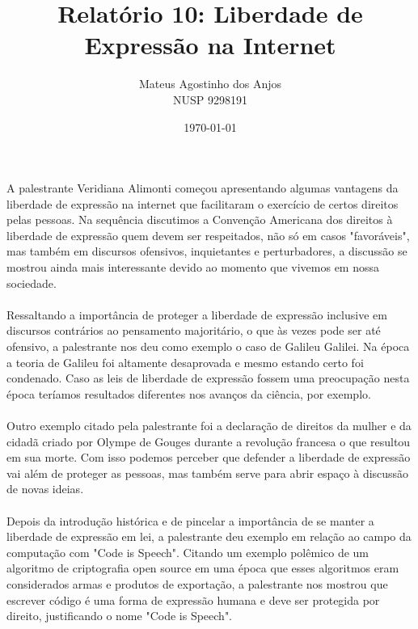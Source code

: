 \documentclass[12pt]{article}
\title{Relatório 10: Liberdade de Expressão na Internet}
\author{Mateus Agostinho dos Anjos\\NUSP 9298191}
\date{\today}
\begin{document}
	\maketitle
	\paragraph{}
		A palestrante Veridiana Alimonti começou apresentando algumas vantagens
		da liberdade de expressão na internet que facilitaram o exercício de certos 
		direitos pelas pessoas. Na sequência discutimos a Convenção Americana dos 
		direitos à liberdade de expressão quem devem ser respeitados, não só em casos
		"favoráveis", mas também em discursos ofensivos, inquietantes e perturbadores,
		a discussão se mostrou ainda mais interessante devido ao momento que vivemos
		em nossa sociedade.
	\paragraph{}
		Ressaltando a importância de proteger a liberdade de expressão inclusive
		em discursos contrários ao pensamento majoritário, o que às vezes pode
		ser até ofensivo, a palestrante nos deu como exemplo o caso de Galileu Galilei.
		Na época a teoria de Galileu foi altamente desaprovada e mesmo estando certo
		foi condenado. Caso as leis de liberdade de expressão fossem uma preocupação
		nesta época teríamos resultados diferentes nos avanços da ciência, por exemplo.
	\paragraph{}
		Outro exemplo citado pela palestrante foi a	declaração de direitos da mulher e 
		da cidadã criado por Olympe de Gouges durante a revolução francesa o que 
		resultou em sua morte. Com isso podemos perceber que defender a liberdade
		de expressão vai além de proteger as pessoas, mas também serve para abrir
		espaço à discussão de novas ideias.
	\paragraph{}
		Depois da introdução histórica e de pincelar a importância de se manter
		a liberdade de expressão em lei, a palestrante deu exemplo em relação
		ao campo da computação com "Code is Speech". Citando um exemplo 
		polêmico de um algoritmo de criptografia open source em uma época que
		esses algoritmos eram considerados armas e produtos de exportação, a
		palestrante nos mostrou que escrever código é uma forma de expressão
		humana e deve ser protegida por direito, justificando o nome "Code is Speech".
\end{document}
